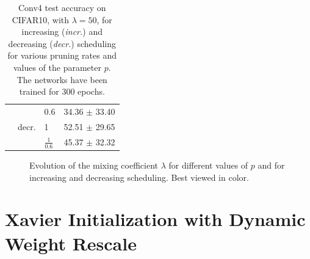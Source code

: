\begin{table}[htbp]
\begin{tabular}{lllc}
        \cline{2-4}
                                   & \multirow{3}{*}{decr.}   & 0.6             & 34.36 $\pm$ 33.40           \\
                                   &                          & 1               & 52.51 $\pm$ 29.65           \\
                                   &                          & $\frac{1}{0.6}$ & 45.37 $\pm$ 32.32           \\
        \bottomrule
    \end{tabular}
    \caption{Conv4 test accuracy on CIFAR10, with $\lambda=50$, for increasing
        (\emph{incr.}) and decreasing (\emph{decr.}) scheduling for various pruning
        rates and values of the parameter $p$. The networks have been trained for
        300 epochs.}
    \label{sec:appendix:annihiliation_table}
\end{table}


\begin{figure}[!h]
    \centering
    \caption{Evolution of the mixing coefficient $\lambda$ for different values
        of $p$ and for increasing and decreasing scheduling. Best viewed in color.}
    \label{fig:appendix:annihiliation_inc_dec}
\end{figure}

\section{Xavier Initialization with Dynamic Weight Rescale}
\label{sec:appendix:xavier_init}